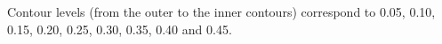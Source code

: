 Contour levels (from the outer to the inner contours) correspond to 0.05, 0.10, 0.15, 0.20, 0.25, 0.30, 0.35, 0.40 and 0.45.
